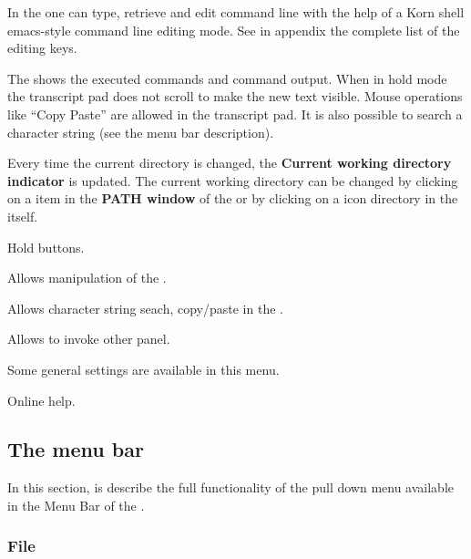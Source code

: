 \begin{EnumZB}
\item In the \IP{} one can type, retrieve and edit command line with the help of
      a Korn shell emacs-style command line editing mode. See in appendix the 
      complete list of the editing keys.
\item The \TP{}  shows the executed commands and command output.
      When in hold mode  the transcript pad does not scroll to make 
      the new text
      visible. Mouse operations like ``Copy Paste'' are allowed in the 
      transcript pad. It is also possible to search a character string (see the
      menu bar description).
\item Every time the current directory is changed, the {\bf Current working 
      directory indicator} is updated. The current working directory can be 
      changed by clicking on a item in the {\bf PATH window} of the \MB{} or
      by clicking on a icon directory in the \MB{} itself.
\item Hold buttons.
\end{EnumZB}
\begin{EnumZW}
\item Allows manipulation of the \TP. 
\item Allows character string seach, copy/paste in the \TP.
\item Allows to invoke other panel. 
\item Some general settings are available in this menu. 
\item Online help.
\end{EnumZW}


\subsection{The \EW{} menu bar}
In this section, is describe the full functionality of the pull down
menu available in the Menu Bar of the \EW.


\subsubsection{File}

